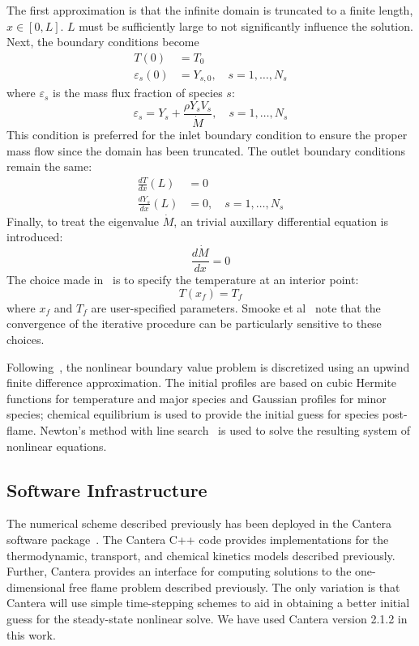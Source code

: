 The first approximation is that the infinite domain is truncated to a
finite length, $x\in[0,L]$. $L$ must be sufficiently large to not
significantly influence the solution. Next, the boundary conditions
become
%
\begin{align}
  T(0) &= T_0 \\
  \varepsilon_s(0) &= Y_{s,0}, \quad s = 1, \dots, N_s
\end{align}
%
where $\varepsilon_s$ is the mass flux fraction of species $s$:
%
\begin{equation}
  \varepsilon_s = Y_s + \frac{\rho Y_s V_s}{\dot{M}}, \quad s = 1, \dots, N_s
\end{equation}
%
This condition is preferred for the inlet boundary condition to ensure
the proper mass flow since the domain has been truncated.
The outlet boundary conditions remain the same:
%
\begin{align}
  \frac{dT}{dx}(L) &= 0 \\
  \frac{dY_s}{dx}(L) &= 0, \quad s = 1, \dots, N_s
\end{align}
%
Finally, to treat the eigenvalue $\dot{M}$, an trivial auxillary
differential equation is introduced:
%
\begin{equation}
  \frac{d\dot{M}}{dx} = 0
\end{equation}
%
The choice made in~\cite{Smooke} is to specify the temperature at an
interior point:
%
\begin{equation}
  T(x_f) = T_f
\end{equation}
%
where $x_f$ and $T_f$ are user-specified parameters. Smooke et
al~\cite{Smooke} note that the convergence of the iterative procedure
can be particularly sensitive to these choices.

Following~\cite{Smooke}, the nonlinear boundary value problem is discretized using an upwind
finite difference approximation. The initial profiles are based on
cubic Hermite functions for temperature and major species and Gaussian
profiles for minor species; chemical equilibrium is used to provide
the initial guess for species post-flame. Newton's method with line
search~\cite{NocedalWright1999} is used to solve the resulting system
of nonlinear equations.

\subsection{Software Infrastructure}

The numerical scheme described previously has been deployed in the
Cantera software package~\cite{Cantera}. The Cantera C++ code provides
implementations for the thermodynamic, transport, and chemical
kinetics models described previously. Further, Cantera provides an
interface for computing solutions to the one-dimensional free flame
problem described previously. The only variation is that Cantera will
use simple time-stepping schemes to aid in obtaining a better initial
guess for the steady-state nonlinear solve. We have used Cantera
version 2.1.2 in this work.



